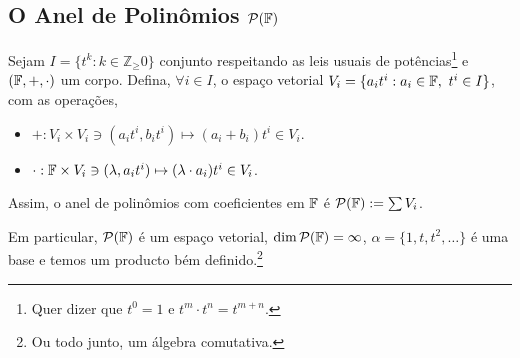 \subsection*{O Anel de Polinômios \(\mathcal{P}(\mathbb{F})\)}

\begin{definition}
    Sejam \(I = \{t^k: k\in \mathbb{Z}_\geq0\}\) conjunto respeitando as leis usuais de potências\footnote{Quer dizer que \(t^0 =1\) e \(t^m\cdot t^n=t^{m+n}\).  } e \((\mathbb{F},+,\cdot)\) um corpo. Defina, \(\forall i \in I\), o espaço vetorial \(V_i = \{a_it^i: a_i \in \mathbb{F}, \  t^i \in I\}\), com as operações, 
    \begin{itemize}
        \item \(+: V_i \times V_i \ni (a_it^i , b_it^i) \mapsto (a_i+b_i)t^i \in V_i\). 
        \item \(\cdot: \mathbb{F} \times V_i \ni (\lambda, a_it^i) \mapsto (\lambda\cdot a_i) t^i \in V_i\). 
    \end{itemize} 
    Assim, o anel de polinômios com coeficientes em \(\mathbb{F}\) é \(\mathcal{P}(\mathbb{F}) := \sum V_i\).  
\end{definition}

\newcommand{\Pol}{\mathcal{P}(\F)}
\begin{note}
    Em particular, \(\Pol\) é um espaço vetorial, \(\dim \Pol = \infty\), \(\alpha = \{1, t, t^2, \ldots \}\) é uma base e temos um producto bém definido.\footnote{Ou todo junto, um álgebra comutativa.} 
\end{note}